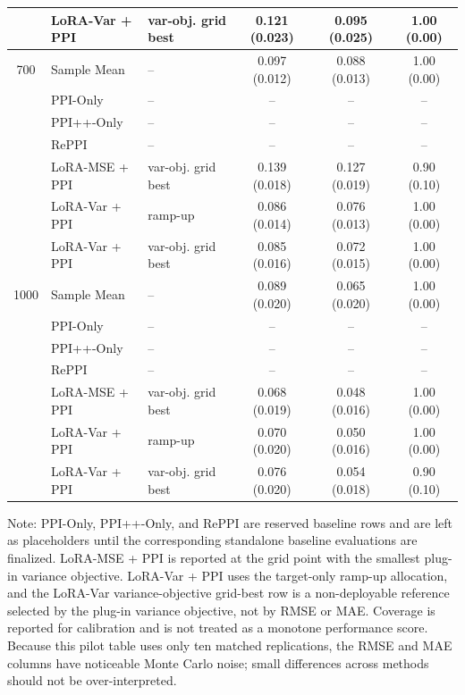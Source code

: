 \documentclass[11pt]{article}
\newcommand{\NA}{\multicolumn{1}{c}{--}}
\begin{document}
\begin{table}[H]
\begin{tabularx}{\textwidth}{@{}c X l c c c@{}}
    & LoRA-Var + PPI & var-obj. grid best & 0.121 (0.023) & 0.095 (0.025) & 1.00 (0.00) \\
\midrule
700 & Sample Mean & -- & 0.097 (0.012) & 0.088 (0.013) & 1.00 (0.00) \\
    & PPI-Only & -- & \NA & \NA & \NA \\
    & PPI++-Only & -- & \NA & \NA & \NA \\
    & RePPI & -- & \NA & \NA & \NA \\
    & LoRA-MSE + PPI & var-obj. grid best & 0.139 (0.018) & 0.127 (0.019) & 0.90 (0.10) \\
    & LoRA-Var + PPI & ramp-up & 0.086 (0.014) & 0.076 (0.013) & 1.00 (0.00) \\
    & LoRA-Var + PPI & var-obj. grid best & 0.085 (0.016) & 0.072 (0.015) & 1.00 (0.00) \\
\midrule
1000 & Sample Mean & -- & 0.089 (0.020) & 0.065 (0.020) & 1.00 (0.00) \\
     & PPI-Only & -- & \NA & \NA & \NA \\
     & PPI++-Only & -- & \NA & \NA & \NA \\
     & RePPI & -- & \NA & \NA & \NA \\
     & LoRA-MSE + PPI & var-obj. grid best & 0.068 (0.019) & 0.048 (0.016) & 1.00 (0.00) \\
     & LoRA-Var + PPI & ramp-up & 0.070 (0.020) & 0.050 (0.016) & 1.00 (0.00) \\
     & LoRA-Var + PPI & var-obj. grid best & 0.076 (0.020) & 0.054 (0.018) & 0.90 (0.10) \\
\bottomrule
\end{tabularx}
\vspace{0.5em}

\begin{minipage}{0.96\textwidth}
\footnotesize
Note: PPI-Only, PPI++-Only, and RePPI are reserved baseline rows and are left as placeholders until
the corresponding standalone baseline evaluations are finalized. LoRA-MSE + PPI is reported at
the grid point with the smallest plug-in variance objective. LoRA-Var + PPI uses the target-only ramp-up allocation,
and the LoRA-Var variance-objective grid-best row is a non-deployable reference selected by
the plug-in variance objective, not by RMSE or MAE. Coverage is reported for calibration and is
not treated as a monotone performance score. Because this pilot table uses only ten matched
replications, the RMSE and MAE columns have noticeable Monte Carlo noise; small differences across
methods should not be over-interpreted.
\end{minipage}
\end{table}
\end{document}
